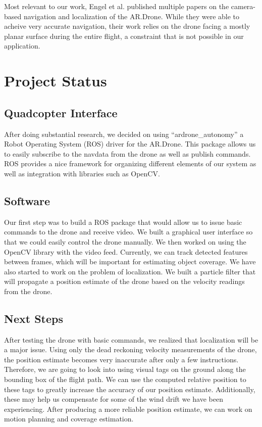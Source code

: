 \documentclass[pageno]{jpaper}
\begin{document}
Most relevant to our work, Engel et al. published multiple papers on the camera-based navigation and localization of the AR.Drone. While they were able to acheive very accurate navigation, their work relies on the drone facing a mostly planar surface during the entire flight, a constraint that is not possible in our application.


\section{Project Status}

\subsection{Quadcopter Interface}

After doing substantial research, we decided on using  ``ardrone\_autonomy'' a Robot Operating System (ROS) driver for the AR.Drone. This package allows us to easily subscribe to the navdata from the drone as well as publish commands. ROS provides a nice framework for organizing different elements of our system as well as integration with libraries such as OpenCV.

\subsection{Software}

Our first step was to build a ROS package that would allow us to issue basic commands to the drone and receive video. We built a graphical user interface so that we could easily control the drone manually. We then worked on using the OpenCV library with the video feed. Currently, we can track detected features between frames, which will be important for estimating object coverage. We have also started to work on the problem of localization. We built a particle filter that will propagate a position estimate of the drone based on the velocity readings from the drone.

\subsection{Next Steps}

After testing the drone with basic commands, we realized that localization will be a major issue. Using only the dead reckoning velocity measurements of the drone, the position estimate becomes very inaccurate after only a few instructions. Therefore, we are going to look into using visual tags on the ground along the bounding box of the flight path. We can use the computed relative position to these tags to greatly increase the accuracy of our position estimate. Additionally, these may help us compensate for some of the wind drift we have been experiencing. After producing a more reliable position estimate, we can work on motion planning and coverage estimation.
\end{document}
